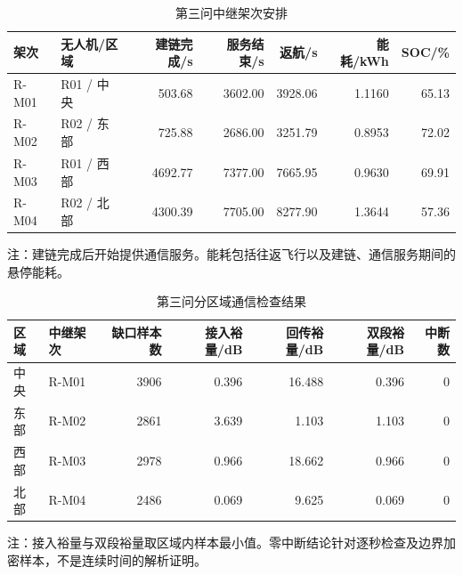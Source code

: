 \begin{table}[htbp]
\centering
\small
\caption{第三问中继架次安排}
\label{tab:q3-relay}
\setlength{\tabcolsep}{6pt}
\renewcommand{\arraystretch}{1.2}
\begin{tabular}{llrrrrr}
\toprule
架次 & 无人机/区域 & 建链完成/s & 服务结束/s & 返航/s & 能耗/kWh & SOC/\% \\
\midrule
R-M01 & R01 / 中央 & 503.68 & 3602.00 & 3928.06 & 1.1160 & 65.13 \\
R-M02 & R02 / 东部 & 725.88 & 2686.00 & 3251.79 & 0.8953 & 72.02 \\
R-M03 & R01 / 西部 & 4692.77 & 7377.00 & 7665.95 & 0.9630 & 69.91 \\
R-M04 & R02 / 北部 & 4300.39 & 7705.00 & 8277.90 & 1.3644 & 57.36 \\
\bottomrule
\end{tabular}
\par\smallskip
\begin{minipage}{0.98\linewidth}
\footnotesize 注：建链完成后开始提供通信服务。能耗包括往返飞行以及建链、通信服务期间的悬停能耗。
\end{minipage}
\end{table}

\begin{table}[htbp]
\centering
\small
\caption{第三问分区域通信检查结果}
\label{tab:q3-coverage}
\setlength{\tabcolsep}{6pt}
\renewcommand{\arraystretch}{1.2}
\begin{tabular}{llrrrrr}
\toprule
区域 & 中继架次 & 缺口样本数 & 接入裕量/dB & 回传裕量/dB & 双段裕量/dB & 中断数 \\
\midrule
中央 & R-M01 & 3906 & 0.396 & 16.488 & 0.396 & 0 \\
东部 & R-M02 & 2861 & 3.639 & 1.103 & 1.103 & 0 \\
西部 & R-M03 & 2978 & 0.966 & 18.662 & 0.966 & 0 \\
北部 & R-M04 & 2486 & 0.069 & 9.625 & 0.069 & 0 \\
\bottomrule
\end{tabular}
\par\smallskip
\begin{minipage}{0.98\linewidth}
\footnotesize 注：接入裕量与双段裕量取区域内样本最小值。零中断结论针对逐秒检查及边界加密样本，不是连续时间的解析证明。
\end{minipage}
\end{table}
